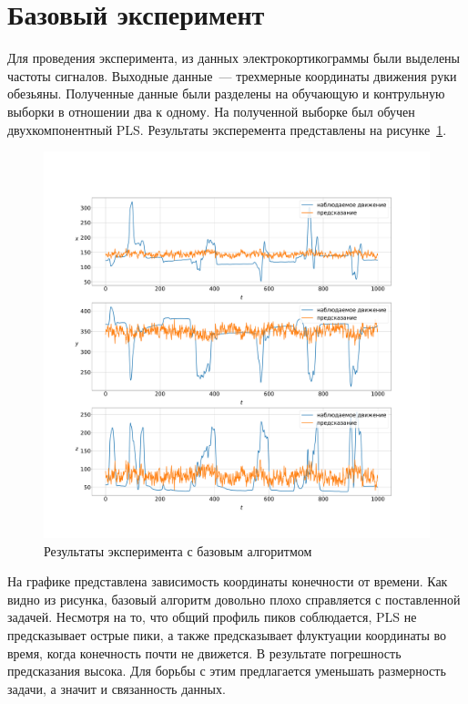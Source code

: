 \section{Базовый эксперимент}
Для проведения эксперимента, из данных электрокортикограммы были выделены частоты сигналов. Выходные данные~--- трехмерные координаты движения руки обезьяны. Полученные данные были разделены на обучающую и контрульную выборки в отношении два к одному. На полученной выборке был обучен двухкомпонентный PLS. Результаты эксперемента представлены на рисунке~\ref{fig:baseAlgo}.
\begin{figure}
  \begin{center}
    \includegraphics[width=\textwidth]{base_algo.pdf}
    \caption{Результаты эксперимента с базовым алгоритмом}
    \label{fig:baseAlgo}
  \end{center}
\end{figure}
На графике представлена зависимость координаты конечности от времени. Как видно из рисунка, базовый алгоритм довольно плохо справляется с поставленной задачей. Несмотря на то, что общий профиль пиков соблюдается, PLS не предсказывает острые пики, а также предсказывает флуктуации координаты во время, когда конечность почти не движется. В результате погрешность предсказания высока. Для борьбы с этим предлагается уменьшать размерность задачи, а значит и связанность данных.
